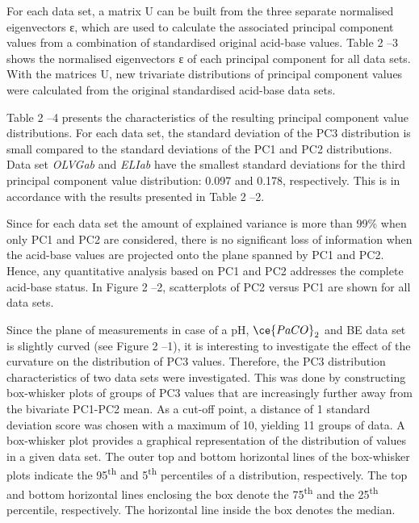 \documentclass[
  12pt,
  a4paperpaper,
]{report}
\begin{document}
For each data set, a matrix U can be built from the three separate
normalised eigenvectors ε, which are used to calculate the associated
principal component values from a combination of standardised original
acid-base values. Table 2 --3 shows the normalised eigenvectors ε of
each principal component for all data sets. With the matrices U, new
trivariate distributions of principal component values were calculated
from the original standardised acid-base data sets.

Table 2 --4 presents the characteristics of the resulting principal
component value distributions. For each data set, the standard deviation
of the PC3 distribution is small compared to the standard deviations of
the PC1 and PC2 distributions. Data set \emph{OLVGab} and \emph{ELIab}
have the smallest standard deviations for the third principal component
value distribution: 0.097 and 0.178, respectively. This is in accordance
with the results presented in Table 2 --2.

Since for each data set the amount of explained variance is more than
99\% when only PC1 and PC2 are considered, there is no significant loss
of information when the acid-base values are projected onto the plane
spanned by PC1 and PC2. Hence, any quantitative analysis based on PC1
and PC2 addresses the complete acid-base status. In Figure 2 --2,
scatterplots of PC2 versus PC1 are shown for all data sets.

Since the plane of measurements in case of a pH, \(\ce{PaCO}_{2}\) and
BE data set is slightly curved (see Figure 2 --1), it is interesting to
investigate the effect of the curvature on the distribution of PC3
values. Therefore, the PC3 distribution characteristics of two data sets
were investigated. This was done by constructing box-whisker plots of
groups of PC3 values that are increasingly further away from the
bivariate PC1-PC2 mean. As a cut-off point, a distance of 1 standard
deviation score was chosen with a maximum of 10, yielding 11 groups of
data. A box-whisker plot provides a graphical representation of the
distribution of values in a given data set. The outer top and bottom
horizontal lines of the box-whisker plots indicate the
95\textsuperscript{th} and 5\textsuperscript{th} percentiles of a
distribution, respectively. The top and bottom horizontal lines
enclosing the box denote the 75\textsuperscript{th} and the
25\textsuperscript{th} percentile, respectively. The horizontal line
inside the box denotes the median.
\end{document}
